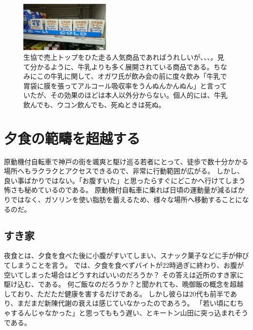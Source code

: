 \begin{figure}[h]
\centering
\includegraphics[width=0.4\textwidth]{./section/Shokuji/figures/ObaCoffee.jpg}
  \caption{生協で売上トップをひた走る人気商品であればうれしいが、、、。見て分かるように、牛乳よりも多く展開されている商品である。ちなみにこの牛乳に関して、オガワ氏が飲み会の前に度々飲み「牛乳で胃袋に膜を張ってアルコール吸収率をうんぬんかんぬん」と言っていたが、その効果のほどは本人以外分からない。個人的には、牛乳飲んでも、ウコン飲んでも、死ぬときは死ぬ。}
\label{Fig:Seiza}
\end{figure}

\section{夕食の範疇を超越する}
原動機付自転車で神戸の街を颯爽と駆け巡る若者にとって、徒歩で数十分かかる場所へもラクラクとアクセスできるので、非常に行動範囲が広がる。
しかし、良い事ばかりではない。「お腹すいた」と思ったらすぐにどこかへ行けてしまう怖さも秘めているのである。
原動機付自転車に乗れば日頃の運動量が減るばかりではなく、ガソリンを使い脂肪を蓄えるため、様々な場所へ移動することになるのだ。


\subsection{すき家}
夜食とは、夕食を食べた後に小腹がすいてしまい、スナック菓子などに手が伸びてしまうことを言う。
では、夕食を食べずバイトが22時過ぎに終わり、お腹が空いてしまった場合はどうすればいいのだろうか？
その答えは近所のすき家に駆け込む、である。
何ご飯なのだろうか？と聞かれても、晩御飯の概念を超越しており、ただただ健康を害するだけである。
しかし彼らは20代も前半であり、まだまだ新陳代謝の衰えは感じていなかったのであろう。
「若い頃にむちゃするんじゃなかった」と思ってももう遅い、とキートン山田に突っ込まれそうである。

